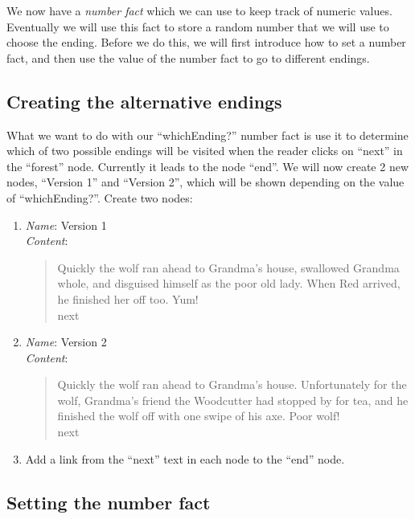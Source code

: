 \documentclass{article}
\begin{document}
We now have a \textit{number fact} which we can use to keep track of 
numeric values. Eventually we will use this fact to store a random number that we will use to choose the ending. Before we do this, we will first introduce how to set a number fact, and then use the value of the number fact to go to different endings.

\subsection{Creating the alternative endings}

What we want to do with our ``whichEnding?'' number fact is use it to 
determine which of two possible endings will be visited when the 
reader clicks on ``next'' in the ``forest'' node. Currently it leads 
to the node ``end''. We will now create 2 new nodes, ``Version 1'' 
and ``Version 2'', which will be shown depending on the value of 
``whichEnding?''. Create two nodes:

\begin{enumerate}
  \item \textit{Name}: Version 1\\
  \textit{Content}: 
  \begin{quotation}
  \noindent Quickly the wolf ran ahead to Grandma's house, swallowed 
  Grandma whole, and disguised himself as the poor old lady. When Red 
  arrived, he finished her off too. Yum! \\

  \noindent next
  \end{quotation}
  \item \textit{Name}: Version 2\\
  \textit{Content}: 
  \begin{quotation}
  \noindent Quickly the wolf ran ahead to Grandma's house. 
  Unfortunately for the wolf, Grandma's friend the Woodcutter had 
  stopped by for tea, and he finished the wolf off with one swipe of 
  his axe. Poor wolf! \\

  \noindent next
  \end{quotation}
  \item Add a link from the ``next'' text in each node to the ``end'' node.
\end{enumerate}


\subsection{Setting the number fact}
\end{document}
